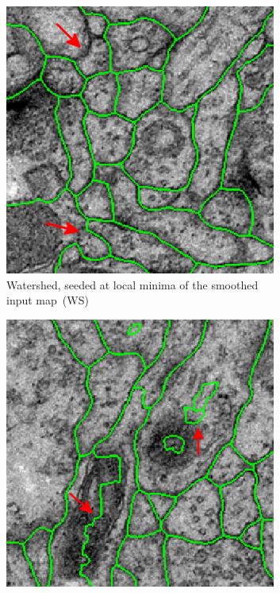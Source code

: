 \begin{figure}[htp]
    \begin{subfigure}[t]{0.41 \linewidth}
        \centering
        \includegraphics[width=0.98\textwidth]{figures/MWS/images/ws_2.png}
        \caption{Watershed, seeded at local minima of the smoothed input map~(WS)} \label{fig:ws}
    \end{subfigure}\hspace{0.5cm}%
    \begin{subfigure}[t]{0.41 \linewidth}
        \centering
        \includegraphics[width=0.98\textwidth]{figures/MWS/images/wsdt_22.png}

\end{subfigure}
\end{figure}
